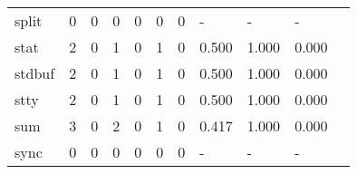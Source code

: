 \begin{longtable}{lp{1.2cm}p{1.2cm}p{1.2cm}p{1.2cm}p{1.2cm}p{1.2cm}p{1.2cm}p{1.2cm}p{1.2cm}p{1.2cm}}
split     &                                     0 &                                                  0 &                                                  0 &                                                  0 &                                                  0 &                                                  0 &                                                  - &                                                  - &                                                  - \\
stat      &                                     2 &                                                  0 &                                                  1 &                                                  0 &                                                  1 &                                                  0 &                                              0.500 &                                              1.000 &                                              0.000 \\
stdbuf    &                                     2 &                                                  0 &                                                  1 &                                                  0 &                                                  1 &                                                  0 &                                              0.500 &                                              1.000 &                                              0.000 \\
stty      &                                     2 &                                                  0 &                                                  1 &                                                  0 &                                                  1 &                                                  0 &                                              0.500 &                                              1.000 &                                              0.000 \\
sum       &                                     3 &                                                  0 &                                                  2 &                                                  0 &                                                  1 &                                                  0 &                                              0.417 &                                              1.000 &                                              0.000 \\
sync      &                                     0 &                                                  0 &                                                  0 &                                                  0 &                                                  0 &                                                  0 &                                                  - &                                                  - &                                                  - \\

\end{longtable}

